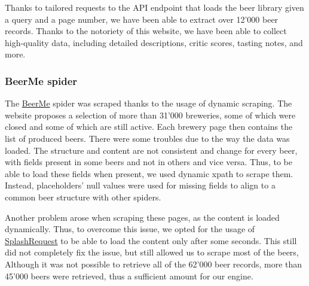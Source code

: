 Thanks to tailored requests to the API endpoint that loads the beer library given a query and a page number, we have been able to extract over 12'000 beer records. Thanks to the notoriety of this website, we have been able to collect high-quality data, including detailed descriptions, critic scores, tasting notes, and more.


\subsubsection{BeerMe spider}

The \href{https://beerme.com/beerlist.php}{BeerMe} spider was scraped thanks to the usage of dynamic scraping. The website proposes a selection of more than 31'000 breweries, some of which were closed and some of which are still active. Each brewery page then contains the list of produced beers. There were some troubles due to the way the data was loaded. The structure and content are not consistent and change for every beer, with fields present in some beers and not in others and vice versa. Thus, to be able to load these fields when present, we used dynamic xpath to scrape them. Instead, placeholders' null values were used for missing fields to align to a common beer structure with other spiders. 

Another problem arose when scraping these pages, as the content is loaded dynamically. Thus, to overcome this issue, we opted for the usage of \href{https://github.com/scrapy-plugins/scrapy-splash#requests}{SplashRequest} to be able to load the content only after some seconds. This still did not completely fix the issue, but still allowed us to scrape most of the beers, Although it was not possible to retrieve all of the 62'000 beer records, more than 45'000 beers were retrieved, thus a sufficient amount for our engine.
